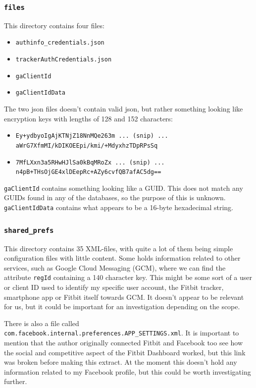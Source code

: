 \documentclass[a4paper,11pt,dvips]{article}
\begin{document}
\subsubsection{\texttt{files}}

This directory contains four files:

\begin{itemize}
\item \texttt{authinfo\_credentials.json}
\item \texttt{trackerAuthCredentials.json}
\item \texttt{gaClientId}
\item \texttt{gaClientIdData}
\end{itemize}

\noindent
The two json files doesn't contain valid json, but rather something looking like encryption keys with lengths of 128 and 152 characters:

\scriptsize
\begin{itemize}
\item \texttt{Ey+ydbyoIgAjKTNjZ18NnMQe263m ... (snip) ... aWrG7XfmMI/kDIKOEEpi/kmi/+MdyxhzTDpRPsSq}
\item \texttt{7MfLXxn3a5RHwHJlSa0kBqMRoZx ... (snip) ... n4pB+THsOjGE4xlDEepRc+AZy6cvfQB7afAC5dg==}
\end{itemize}
\normalsize

\noindent
\texttt{gaClientId} contains something looking like a GUID. This does not match any GUIDs found in any of the databases, so the purpose of this is unknown. \texttt{gaClientIdData} contains what appears to be a 16-byte hexadecimal string.

\subsubsection{\texttt{shared\_prefs}}
This directory contains 35 XML-files, with quite a lot of them being simple configuration files with little content. Some holds information related to other services, such as Google Cloud Messaging (GCM), where we can find the attribute \texttt{regId} containing a 140 character key. This might be some sort of a user or client ID used to identify my specific user account, the Fitbit tracker, smartphone app or Fitbit itself towards GCM. It doesn’t appear to be relevant for us, but it could be important for an investigation depending on the scope.

There is also a file called \texttt{com.facebook.internal.preferences.APP\_SETTINGS.xml}. It is important to mention that the author originally connected Fitbit and Facebook too see how the social and competitive aspect of the Fitbit Dashboard worked, but this link was broken before making this extract. At the moment this doesn’t hold any information related to my Facebook profile, but this could be worth investigating further.
\end{document}
